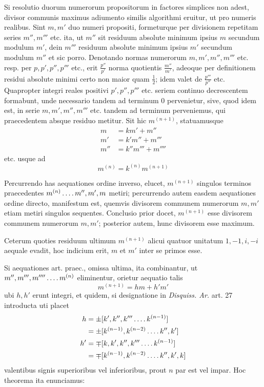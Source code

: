 Si resolutio duorum numerorum propositorum in factores simplices non adest, divisor communis maximus adiumento similis algorithmi eruitur, ut pro numeris realibus. Sint $m,m'$ duo numeri propositi, formeturque per divisionem repetitam series $m'',m'''$ etc. ita, ut $m''$ sit residuum absolute minimum ipsius $m$ secundum modulum $m'$, dein $m'''$ residuum absolute minimum ipsius $m'$ secundum modulum $m''$ et sic porro. Denotando normas numerorum $m,m',m'',m'''$ etc. resp. per $p,p',p'',p'''$ etc., erit $\frac{p''}{p'}$ norma quotientis $\frac{m''}{m'}$, adeoque per definitionem residui absolute minimi certo non maior quam $\frac12$; idem valet de $\frac{p'''}{p''}$ etc. Quapropter integri reales positivi $p',p'',p'''$ etc. seriem continuo decrescentem formabunt, unde necessario tandem ad terminum $0$ pervenietur, sive, quod idem est, in serie $m,m',m'',m'''$ etc. tandem ad terminum perveniemus, qui praecedentem absque residuo metitur. Sit hic $m^{(n+1)}$, statuamusque
\[
\begin{aligned}
m&=km'+m''\\
m'&=k'm''+m'''\\
m''&=k''m'''+m''''
\end{aligned}
\]
etc. usque ad
\[
m^{(n)}=k^{(n)}m^{(n+1)}
\]

Percurrendo has aequationes ordine inverso, elucet, $m^{(n+1)}$ singulos terminos praecedentes $m^{(n)}\mathinner{.\,.\,.\,.} m'',m',m$ metiri; percurrendo autem easdem aequationes ordine directo, manifestum est, quemvis divisorem communem numerorum $m,m'$ etiam metiri singulos sequentes. Conclusio prior docet, $m^{(n+1)}$ esse divisorem communem numerorum $m,m'$; posterior autem, hunc divisorem esse maximum.

Ceterum quoties residuum ultimum $m^{(n+1)}$ alicui quatuor unitatum $1,-1,i,-i$ aequale evadit, hoc indicium erit, $m$ et $m'$ inter se primos esse.

Si aequationes art. praec., omissa ultima, ita combinantur, ut $m'',\allowbreak m''',\allowbreak m''''\mathinner{.\,.\,.\,.}\allowbreak m^{(n)}$ eliminentur, orietur aequatio talis
\[
m^{(n+1)}=hm+h'm'
\]
%
ubi $h,h'$ erunt integri, et quidem, si designatione in \emph{Disquiss. Ar.} art. 27 introducta uti placet
\[
\begin{aligned}
h&=\pm[k',k'',k'''\mathinner{.\,.\,.\,.} k^{(n-1)}]\\
&=\pm[k^{(n-1)},k^{(n-2)}\mathinner{.\,.\,.\,.} k'',k']\\
h'&=\mp[k,k',k'',k'''\mathinner{.\,.\,.\,.} k^{(n-1)}]\\
&=\mp[k^{(n-1)},k^{(n-2)}\mathinner{.\,.\,.\,.} k'',k',k]
\end{aligned}
\]
valentibus signis superioribus vel inferioribus, prout $n$ par est vel impar. Hoc theorema ita enunciamus:

